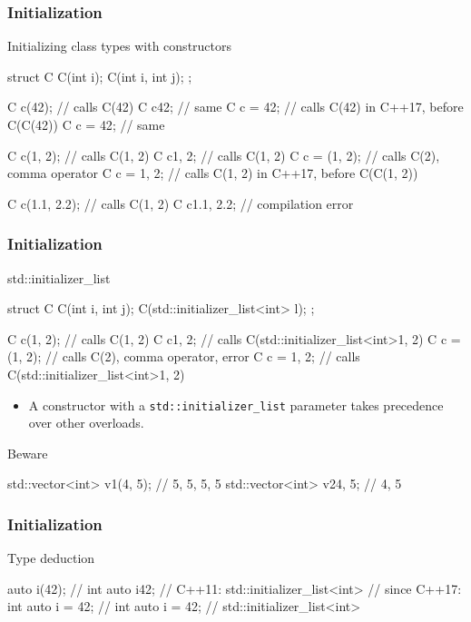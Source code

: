 \begin{frame}[fragile,shrink=10]
  \frametitle{Initialization}
  \begin{block}{Initializing class types with constructors}
    \begin{cppcode}
      struct C {
        C(int i);
        C(int i, int j);
      };

      C c(42);    // calls C(42)
      C c{42};    // same
      C c = 42;   // calls C(42) in C++17, before C(C(42))
      C c = {42}; // same

      C c(1, 2);    // calls C(1, 2)
      C c{1, 2};    // calls C(1, 2)
      C c = (1, 2); // calls C(2), comma operator
      C c = {1, 2}; // calls C(1, 2) in C++17, before C(C(1, 2))

      C c(1.1, 2.2); // calls C(1, 2)
      C c{1.1, 2.2}; // compilation error
    \end{cppcode}
  \end{block}
\end{frame}

\begin{frame}[fragile,shrink=10]
  \frametitle{Initialization}
  \begin{block}{std::initializer\_list}
    \begin{cppcode}
      struct C {
        C(int i, int j);
        C(std::initializer_list<int> l);
      };

      C c(1, 2);    // calls C(1, 2)
      C c{1, 2};    // calls C(std::initializer_list<int>{1, 2})
      C c = (1, 2); // calls C(2), comma operator, error
      C c = {1, 2}; // calls C(std::initializer_list<int>{1, 2})
    \end{cppcode}
    \begin{itemize}
      \item A constructor with a \texttt{std::initializer_list} parameter takes precedence over other overloads.
    \end{itemize}
  \end{block}
  \begin{alertblock}{Beware}
    \begin{cppcode}
      std::vector<int> v1(4, 5); // {5, 5, 5, 5}
      std::vector<int> v2{4, 5}; // {4, 5}
    \end{cppcode}
  \end{alertblock}
\end{frame}

\begin{frame}[fragile]
  \frametitle{Initialization}
  \begin{block}{Type deduction}
    \begin{cppcode}
      auto i(42);    // int
      auto i{42};    // C++11: std::initializer_list<int>
                     // since C++17: int
      auto i = 42;   // int
      auto i = {42}; // std::initializer_list<int>
    \end{cppcode}
  \end{block}
\end{frame}

